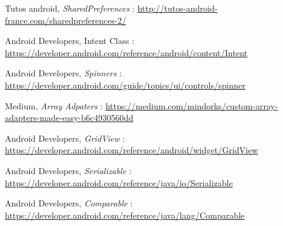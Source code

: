 \documentclass{article}
\begin{document}
\begin{thebibliography}{}

Tutos android, \textit{SharedPreferences} : \url{http://tutos-android-france.com/sharedpreferences-2/}

Android Developers, Intent Class : \url{https://developer.android.com/reference/android/content/Intent}

Android Developers, \textit{Spinners} :
\url{https://developer.android.com/guide/topics/ui/controls/spinner}

Medium, \textit{Array Adpaters} : \url{https://medium.com/mindorks/custom-array-adapters-made-easy-b6c4930560dd}

Android Developers, \textit{GridView} :
\url{https://developer.android.com/reference/android/widget/GridView}

Android Developers, \textit{Serializable} :
\url{https://developer.android.com/reference/java/io/Serializable}

Android Developers, \textit{Comparable} :
\url{https://developer.android.com/reference/java/lang/Comparable}

\end{thebibliography}
\end{document}
